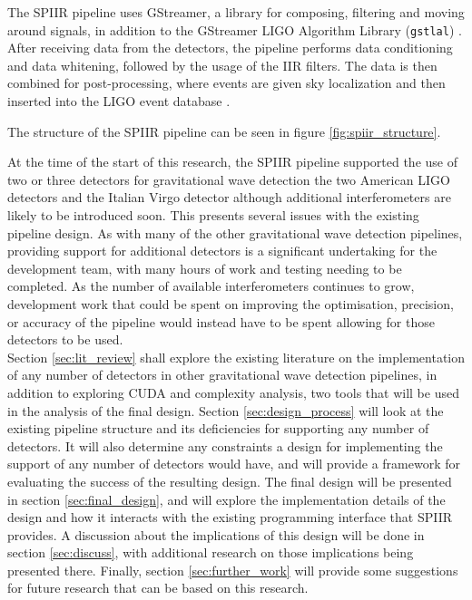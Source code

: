 \documentclass{article}
\begin{document}
The SPIIR pipeline uses GStreamer, a library for composing, filtering and moving around signals, in addition to the GStreamer LIGO Algorithm Library (\texttt{gstlal}) \cite{gstlal}.
After receiving data from the detectors, the pipeline performs data conditioning and data whitening, followed by the usage of the IIR filters.
The data is then combined for post-processing, where events are given sky localization and then inserted into the LIGO event database \cite{SPIIRGPU2018}.

The structure of the SPIIR pipeline can be seen in figure \ref{fig:spiir_structure}.

At the time of the start of this research, the SPIIR pipeline supported the use of two or three detectors for gravitational wave detection \textemdash{} the two American LIGO detectors and the Italian Virgo detector \textemdash{} although additional interferometers are likely to be introduced soon.
This presents several issues with the existing pipeline design.
As with many of the other gravitational wave detection pipelines, providing support for additional detectors is a significant undertaking for the development team, with many hours of work and testing needing to be completed.
As the number of available interferometers continues to grow, development work that could be spent on improving the optimisation, precision, or accuracy of the pipeline would instead have to be spent allowing for those detectors to be used.
\\

Section \ref{sec:lit_review} shall explore the existing literature on the implementation of any number of detectors in other gravitational wave detection pipelines, in addition to exploring CUDA and complexity analysis, two tools that will be used in the analysis of the final design.
Section \ref{sec:design_process} will look at the existing pipeline structure and its deficiencies for supporting any number of detectors.
It will also determine any constraints a design for implementing the support of any number of detectors would have, and will provide a framework for evaluating the success of the resulting design.
The final design will be presented in section \ref{sec:final_design}, and will explore the implementation details of the design and how it interacts with the existing programming interface that SPIIR provides.
A discussion about the implications of this design will be done in section \ref{sec:discuss}, with additional research on those implications being presented there.
Finally, section \ref{sec:further_work} will provide some suggestions for future research that can be based on this research.
\end{document}
